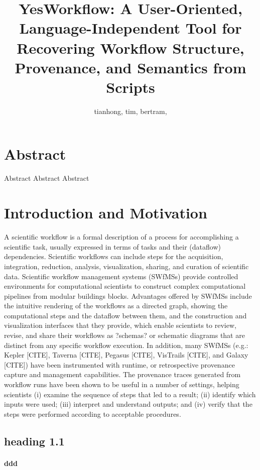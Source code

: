 \documentclass[practice]{ijdc-v9}
\title{YesWorkflow: A User-Oriented, Language-Independent Tool for Recovering Workflow Structure, Provenance, and Semantics from Scripts}
\author{tianhong, tim, bertram,}
\affil{Digital Curation Centre}
\begin{document}
\maketitle

\section{Abstract}
Abstract Abstract   Abstract  
 
\section{Introduction and Motivation}

A scientific workflow\autocite{apa6ed} is a formal description of a process for accomplishing a scientific task, usually expressed in terms of tasks and their (dataflow) dependencies. Scientific workflows can include steps for the acquisition, integration, reduction, analysis, visualization, sharing, and curation of scientific data.  Scientific workflow management systems (SWfMSs) provide controlled environments for computational scientists to construct complex computational pipelines from modular buildings blocks. Advantages offered by SWfMSs include the intuitive rendering of the workflows as a directed graph, showing the computational steps and the dataflow between them, and the construction and visualization interfaces that they provide, which enable scientists to review, revise, and share their workflows as ?schemas? or schematic diagrams that are distinct from any specific workflow execution. In addition, many SWfMSs (e.g.: Kepler [CITE], Taverna [CITE], Pegasus [CITE], VisTrails [CITE], and Galaxy [CITE]) have been instrumented with runtime, or retrospective provenance capture and management capabilities. The provenance traces generated from workflow runs have been shown to be useful in a number of settings, helping scientists (i) examine the sequence of steps that led to a result; (ii) identify which inputs were used; (iii) interpret and understand outputs; and (iv) verify that the steps were performed according to acceptable procedures. 

\subsection{heading 1.1}

\paragraph{ddd}
\end{document}
